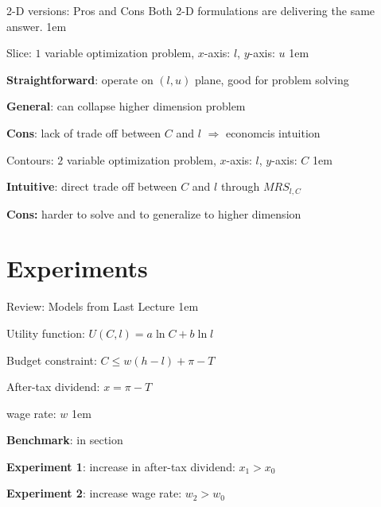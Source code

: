 \documentclass[11pt,aspectratio=43]{beamer}
\let\olditemize=\itemize
\let\endolditemize=\enditemize
\renewenvironment{itemize}{\olditemize \itemsep1em}{\endolditemize}
\let\oldenumerate=\enumerate
\let\endoldenumerate=\endenumerate
\renewenvironment{enumerate}{\oldenumerate \itemsep1em}{ \endoldenumerate}
\theoremstyle{definition}
\begin{document}
\begin{frame}{2-D versions: Pros and Cons}
\label{slide:2_D_versions__Pros_and_Cons}
    Both 2-D formulations are delivering the same answer.
    \begin{enumerate}
        \item Slice: $ 1 $ variable optimization problem, $ x $-axis: $ l $, $ y $-axis: $ u $
        \begin{itemize}
            \item \textbf{Straightforward}: operate on $ ( l, u ) $ plane, good for problem solving
            \item \textbf{General}: can collapse higher dimension problem
            \item \textbf{Cons}: lack of trade off between $ C $ and $ l $ $ \Rightarrow  $ \alert{economcis intuition}
        \end{itemize}
        \item Contours: $ 2 $ variable optimization problem, $ x $-axis: $ l $, $ y $-axis: $ C $
        \begin{itemize}
            \item \textbf{Intuitive}: direct trade off between $ C $ and $ l $ through $ MRS_{l, C} $
            \item \textbf{Cons:} harder to solve and to generalize to higher dimension
        \end{itemize}
    \end{enumerate}

\end{frame}

\section{Experiments}
\label{sec:Experiments}

\begin{frame}{Review: Models from Last Lecture}
\label{slide:Review__Models_from_Last_Lecture}
    \begin{enumerate}
        \item Utility function: $ U( C, l ) = a \ln C + b \ln l $
        \item Budget constraint: $ C \le w( h-l ) + \pi - T $
        \item After-tax dividend: $ x = \pi - T $
        \item wage rate: $ w $
    \end{enumerate}
    \begin{itemize}
        \item \textbf{Benchmark}: in section 
        \item \textbf{Experiment 1}: increase in after-tax dividend: $ x_{1} > x_{0} $
        \item \textbf{Experiment 2}: increase wage rate: $ w_{2} > w_{0} $
    \end{itemize}
\end{frame}
\end{document}
